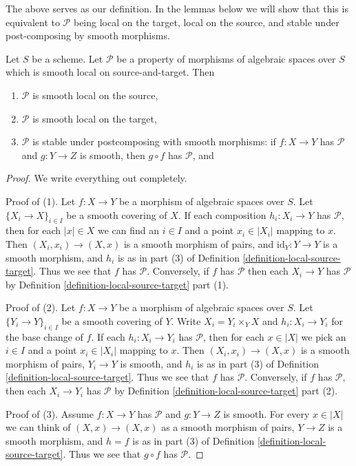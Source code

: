 \noindent
The above serves as our definition. In the lemmas below we will show that
this is equivalent to $\mathcal{P}$ being local on the target, local on
the source, and stable under post-composing by smooth morphisms.

\begin{lemma}
\label{lemma-local-source-target-implies}
Let $S$ be a scheme.
Let $\mathcal{P}$ be a property of morphisms of algebraic spaces over $S$
which is smooth local on source-and-target. Then
\begin{enumerate}
\item $\mathcal{P}$ is smooth local on the source,
\item $\mathcal{P}$ is smooth local on the target,
\item $\mathcal{P}$ is stable under postcomposing with smooth morphisms:
if $f : X \to Y$ has $\mathcal{P}$ and $g : Y \to Z$ is smooth, then
$g \circ f$ has $\mathcal{P}$, and
\end{enumerate}
\end{lemma}

\begin{proof}
We write everything out completely.

\medskip\noindent
Proof of (1). Let $f : X \to Y$ be a morphism of algebraic spaces over $S$.
Let $\{X_i \to X\}_{i \in I}$ be a smooth covering of $X$. If each composition
$h_i : X_i \to Y$ has $\mathcal{P}$, then for each $|x| \in X$ we can find
an $i \in I$ and a point $x_i \in |X_i|$ mapping to $x$. Then
$(X_i, x_i) \to (X, x)$ is a smooth morphism of pairs, and
$\text{id}_Y : Y \to Y$ is a smooth morphism, and $h_i$ is as in part (3) of
Definition \ref{definition-local-source-target}.
Thus we see that $f$ has $\mathcal{P}$.
Conversely, if $f$ has $\mathcal{P}$ then each $X_i \to Y$ has
$\mathcal{P}$ by
Definition \ref{definition-local-source-target} part (1).

\medskip\noindent
Proof of (2). Let $f : X \to Y$ be a morphism of algebraic spaces over $S$.
Let $\{Y_i \to Y\}_{i \in I}$ be a smooth covering of $Y$.
Write $X_i = Y_i \times_Y X$ and $h_i : X_i \to Y_i$ for the base change
of $f$.  If each  $h_i : X_i \to Y_i$ has $\mathcal{P}$, then for each
$x \in |X|$ we pick an $i \in I$ and a point $x_i \in |X_i|$ mapping to $x$.
Then $(X_i, x_i) \to (X, x)$ is a smooth morphism of pairs, $Y_i \to Y$ is
smooth, and $h_i$ is as in part (3) of
Definition \ref{definition-local-source-target}.
Thus we see that $f$ has $\mathcal{P}$.
Conversely, if $f$ has $\mathcal{P}$, then each $X_i \to Y_i$ has
$\mathcal{P}$ by
Definition \ref{definition-local-source-target} part (2).

\medskip\noindent
Proof of (3). Assume $f : X \to Y$ has $\mathcal{P}$ and $g : Y \to Z$ is
smooth. For every $x \in |X|$ we can think of $(X, x) \to (X, x)$ as a
smooth morphism of pairs, $Y \to Z$ is a smooth morphism, and $h = f$ is as
in part (3) of
Definition \ref{definition-local-source-target}.
Thus we see that $g \circ f$ has $\mathcal{P}$.
\end{proof}


